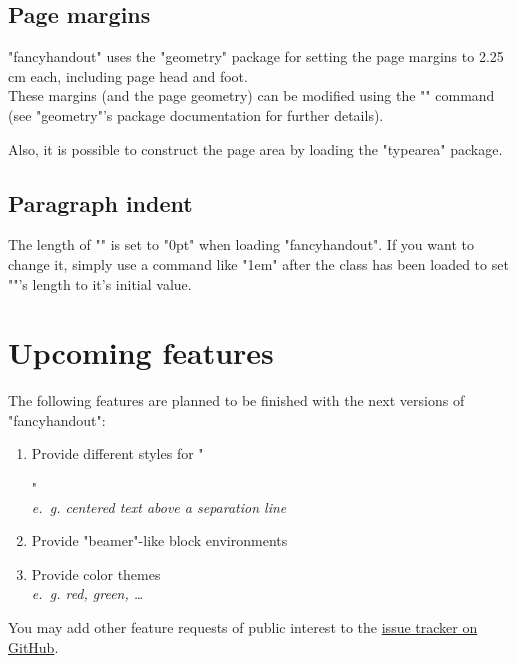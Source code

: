 \documentclass[11pt]{ltxdoc}
\begin{document}
	\subsection{Page margins}
	"fancyhandout" uses the "geometry" package for setting the page margins to 2.25\,cm each, including page head and foot. \\
	\DescribeMacro{\geometry}
	These margins (and the page geometry) can be modified using the "\geometry" command (see "geometry"'s package documentation for further details).
	
	\smallskip
	Also, it is possible to construct the page area by loading the "typearea" package.
	
	\subsection{Paragraph indent}
	\DescribeMacro{\parindent}
	The length of "\parindent" is set to "0pt" when loading "fancyhandout". If you want to change it, simply use a command like "\parindent1em" after the class has been loaded to set "\parindent"'s length to it's initial value.
	
	
	
	
	\clearpage
	\section{Upcoming features}
	The following features are planned to be finished with the next versions of "fancyhandout":
	\begin{enumerate}
		\item
			Provide different styles for "\maketitle" \\
			\textit{e.~g. centered text above a separation line}
		
		\item
			Provide "beamer"-like block environments
		
		\item
			Provide color themes \\
			\textit{e.~g. red, green, …}
	\end{enumerate}
	
	You may add other feature requests of public interest to the \href{https://github.com/SFr682k/fancyhandout/issues}{issue tracker on GitHub}.
\end{document}
